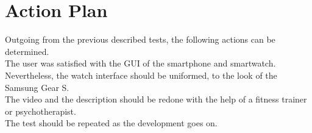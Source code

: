 \section{Action Plan}
Outgoing from the previous described tests, the following actions can be determined.\\
The user was satisfied with the GUI of the smartphone and smartwatch. Nevertheless, the watch interface should be uniformed, to the look of the Samsung Gear S.\\
The video and the description should be redone with the help of a fitness trainer or psychotherapist. \\
The test should be repeated as the development goes on.  